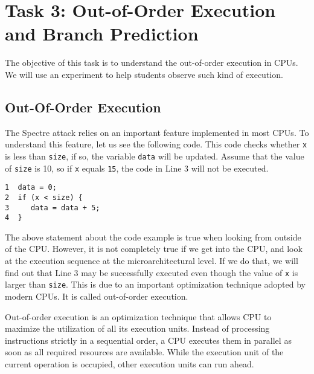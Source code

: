 \newcommand{\sideChannelFigs}{../Meltdown_Attack/Figs}





\section{Task 3: Out-of-Order Execution and Branch Prediction}

The objective of this task is to understand the out-of-order execution
in CPUs. We will use an experiment to help students observe
such kind of execution. 



\subsection{Out-Of-Order Execution} 

The Spectre attack relies on an important feature implemented in most
CPUs.  To understand this feature, let us see the following code. 
This code checks whether \texttt{x} is less than \texttt{size}, if so,
the variable \texttt{data} will be updated. Assume that the value of
\texttt{size} is 10, so if \texttt{x} equals \texttt{15}, 
the code in Line 3 will not be executed.  

\begin{lstlisting}
1  data = 0;
2  if (x < size) {   
3     data = data + 5; 
4  }
\end{lstlisting}
 

The above statement about the code example is true when looking from outside of the CPU.
However, it is not completely true if we get into the CPU, and look at the execution sequence
at the microarchitectural level. If we do that, we will find out that
Line 3 may be successfully executed even though the value of \texttt{x} is 
larger than \texttt{size}. This is due to an important optimization technique adopted by
modern CPUs. It is called out-of-order execution.


Out-of-order execution is an optimization technique that allows CPU to maximize the utilization of
all its execution units. Instead of processing instructions
strictly in a sequential order, a CPU executes them in parallel
as soon as all required resources are available.
While the execution unit of the current operation is occupied, other
execution units can run ahead.

